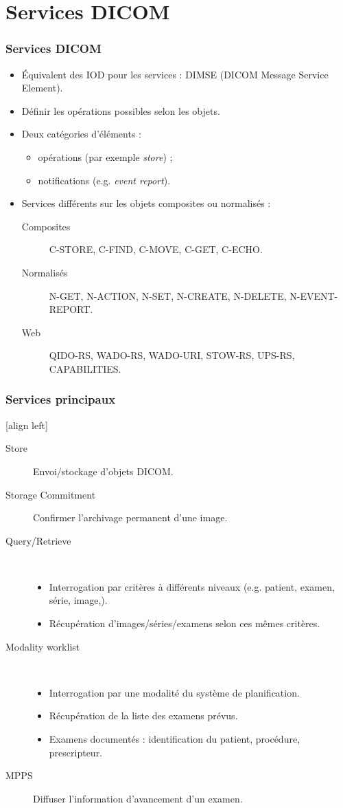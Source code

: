 \section{Services DICOM}

\frame
{
	\frametitle{Services DICOM}
	
	\begin{itemize}
		\item \'Equivalent des IOD pour les services : DIMSE (DICOM Message Service Element).
		\item D\'efinir les op\'erations possibles selon les objets.
		\item Deux cat\'egories d'\'el\'ements :
		\begin{itemize}
			\item op\'erations (par exemple \emph{store}) ;
			\item notifications (e.g. \emph{event report}).
		\end{itemize}
		\item Services diff\'erents sur les objets composites ou normalis\'es :
		\begin{description}
			\item[Composites] C-STORE, C-FIND, C-MOVE, C-GET, C-ECHO.
			\item[Normalis\'es] N-GET, N-ACTION, N-SET, N-CREATE, N-DELETE, N-EVENT-REPORT.
			\item[Web] QIDO-RS, WADO-RS, WADO-URI, STOW-RS, UPS-RS, CAPABILITIES.
		\end{description}
	\end{itemize}
}

\frame
{
	\frametitle{Services principaux}
	[align left]
	\begin{description}
		\item[Store] Envoi/stockage d'objets DICOM.
		\item[Storage Commitment] Confirmer l'archivage permanent d'une image.
		\item[Query/Retrieve]~\\
		\begin{itemize}
			\item Interrogation par crit\`eres \`a diff\'erents niveaux (e.g. patient, examen, s\'erie, image,).
			\item R\'ecup\'eration d'images/s\'eries/examens selon ces m\^emes crit\`eres.
		\end{itemize}
		\item[Modality worklist]~\\
		\begin{itemize}
			\item Interrogation par une modalit\'e du syst\`eme de planification.
			\item R\'ecup\'eration de la liste des examens pr\'evus.
			\item Examens document\'es : identification du patient, proc\'edure, prescripteur.
		\end{itemize}
		\item[MPPS] Diffuser l'information d'avancement d'un examen.
	\end{description}
}

